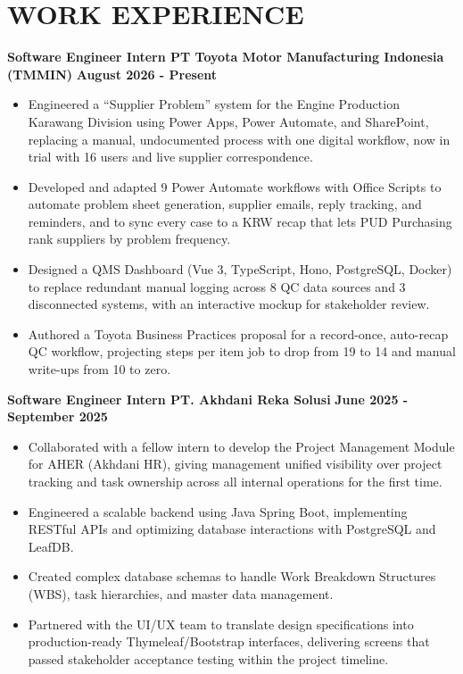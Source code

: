 \documentclass[10pt, a4paper]{article}
\begin{document}
\section*{WORK EXPERIENCE}
\noindent
\textbf{Software Engineer Intern \textbar{} PT Toyota Motor Manufacturing Indonesia (TMMIN)} \hfill \textbf{August 2026 - Present}
\begin{itemize}[leftmargin=0.25in, topsep=2pt, itemsep=0pt, parsep=2pt]
    \item Engineered a ``Supplier Problem'' system for the Engine Production Karawang Division using Power Apps, Power Automate, and SharePoint, replacing a manual, undocumented process with one digital workflow, now in trial with 16 users and live supplier correspondence.
    \item Developed and adapted 9 Power Automate workflows with Office Scripts to automate problem sheet generation, supplier emails, reply tracking, and reminders, and to sync every case to a KRW recap that lets PUD Purchasing rank suppliers by problem frequency.
    \item Designed a QMS Dashboard (Vue 3, TypeScript, Hono, PostgreSQL, Docker) to replace redundant manual logging across 8 QC data sources and 3 disconnected systems, with an interactive mockup for stakeholder review.
    \item Authored a Toyota Business Practices proposal for a record-once, auto-recap QC workflow, projecting steps per item job to drop from 19 to 14 and manual write-ups from 10 to zero.
\end{itemize}

\vspace{4pt}
\noindent
\textbf{Software Engineer Intern \textbar{} PT. Akhdani Reka Solusi} \hfill \textbf{June 2025 - September 2025}
\begin{itemize}[leftmargin=0.25in, topsep=2pt, itemsep=0pt, parsep=2pt]
    \item Collaborated with a fellow intern to develop the Project Management Module for AHER (Akhdani HR), giving management unified visibility over project tracking and task ownership across all internal operations for the first time.
    \item Engineered a scalable backend using Java Spring Boot, implementing RESTful APIs and optimizing database interactions with PostgreSQL and LeafDB.
    \item Created complex database schemas to handle Work Breakdown Structures (WBS), task hierarchies, and master data management.
    \item Partnered with the UI/UX team to translate design specifications into production-ready Thymeleaf/Bootstrap interfaces, delivering screens that passed stakeholder acceptance testing within the project timeline.
\end{itemize}
\end{document}
